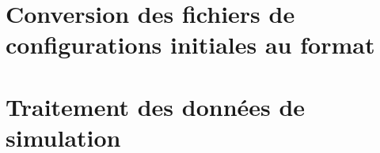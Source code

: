 \documentclass[a4paper, 11pt]{article}
\begin{document}
    
\clearpage

\section{Conversion des fichiers de configurations initiales au format \lammps{}} \label{apdx:conversion_lammps}

    
\clearpage

\section{Traitement des données de simulation} \label{apdx:traitement_donnees}

    
\clearpage

\printbibliography
\end{document}
